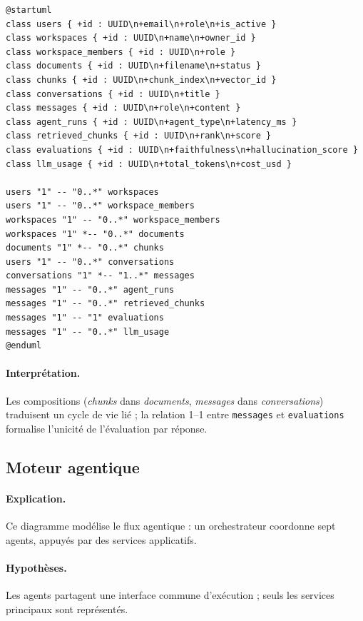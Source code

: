 \begin{lstlisting}[style=plantuml,caption={Diagramme de classes — entités persistantes},label={lst:classes}]
@startuml
class users { +id : UUID\n+email\n+role\n+is_active }
class workspaces { +id : UUID\n+name\n+owner_id }
class workspace_members { +id : UUID\n+role }
class documents { +id : UUID\n+filename\n+status }
class chunks { +id : UUID\n+chunk_index\n+vector_id }
class conversations { +id : UUID\n+title }
class messages { +id : UUID\n+role\n+content }
class agent_runs { +id : UUID\n+agent_type\n+latency_ms }
class retrieved_chunks { +id : UUID\n+rank\n+score }
class evaluations { +id : UUID\n+faithfulness\n+hallucination_score }
class llm_usage { +id : UUID\n+total_tokens\n+cost_usd }

users "1" -- "0..*" workspaces
users "1" -- "0..*" workspace_members
workspaces "1" -- "0..*" workspace_members
workspaces "1" *-- "0..*" documents
documents "1" *-- "0..*" chunks
users "1" -- "0..*" conversations
conversations "1" *-- "1..*" messages
messages "1" -- "0..*" agent_runs
messages "1" -- "0..*" retrieved_chunks
messages "1" -- "1" evaluations
messages "1" -- "0..*" llm_usage
@enduml
\end{lstlisting}

\paragraph{Interprétation.} Les compositions (\emph{chunks} dans \emph{documents},
\emph{messages} dans \emph{conversations}) traduisent un cycle de vie lié ; la
relation 1--1 entre \texttt{messages} et \texttt{evaluations} formalise l'unicité
de l'évaluation par réponse.

\subsection{Moteur agentique}
\paragraph{Explication.} Ce diagramme modélise le flux agentique : un orchestrateur
coordonne sept agents, appuyés par des services applicatifs.
\paragraph{Hypothèses.} Les agents partagent une interface commune d'exécution ;
seuls les services principaux sont représentés.

